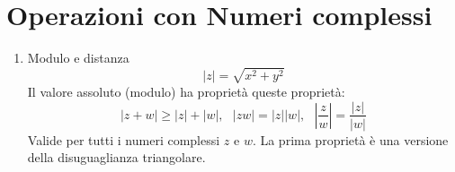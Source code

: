 \documentclass{book}
\newcommand{\abs}[1]{\lvert#1\rvert}
\begin{document}
\section{Operazioni con Numeri complessi}
\begin{enumerate}
\item Modulo e distanza
	\begin{equation}
		\abs{z}=\sqrt{x^2+y^2}
	\end{equation}
	Il valore assoluto (modulo) ha proprietà queste proprietà:
	\begin{equation*}
		\abs{z+w}\geq \abs{z}+\abs{w}, \text{ } \abs{zw}=\abs{z}\abs{w}, \text{ } \left|\frac{z}{w}\right|=\frac{\abs z}{\abs w}
	\end{equation*}
	Valide per tutti i numeri complessi $z$ e $w$. La prima proprietà è una versione della disuguaglianza triangolare.

\end{enumerate}
\printindex
\end{document}
